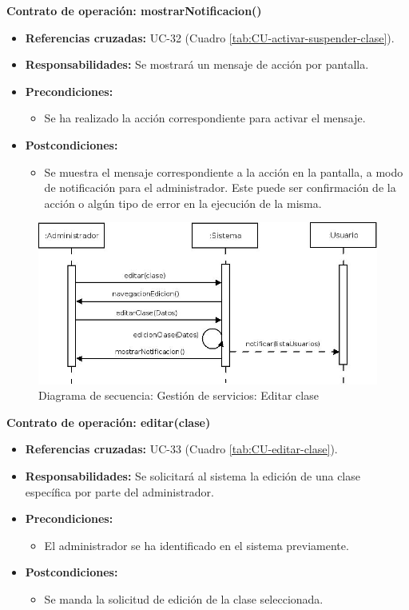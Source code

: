 \textbf{Contrato de operación: mostrarNotificacion()}
\begin{itemize}
\item \textbf{Referencias cruzadas:} UC-32 (Cuadro \ref{tab:CU-activar-suspender-clase}).
\item \textbf{Responsabilidades:} Se mostrará un mensaje de acción por pantalla.
\item \textbf{Precondiciones:} 
 \begin{itemize}
\item Se ha realizado la acción correspondiente para activar el mensaje.
\end {itemize}
\item \textbf{Postcondiciones:} 
 \begin{itemize}
\item Se muestra el mensaje correspondiente a la acción en la pantalla, a modo de notificación para el administrador. Este puede ser confirmación de la acción o algún tipo de error en la ejecución de la misma.
\end {itemize}
\end {itemize}


\vspace{10mm}

\begin{figure}[H]
\centering
  \includegraphics[scale=.50]{img/secuencias/gestion-servicios-editar-clase.jpeg}
  \caption{Diagrama de secuencia: Gestión de servicios: Editar clase}
  \label{fig:secuencia-editar-clase}
\end{figure}

\textbf{Contrato de operación: editar(clase)}
\begin{itemize}
\item \textbf{Referencias cruzadas:} UC-33 (Cuadro \ref{tab:CU-editar-clase}).
\item \textbf{Responsabilidades:} Se solicitará al sistema la edición de una clase específica por parte del administrador.
\item \textbf{Precondiciones:} 
 \begin{itemize}
\item El administrador se ha identificado en el sistema previamente.
\end {itemize}
\item \textbf{Postcondiciones:} 
 \begin{itemize}
\item Se manda la solicitud de edición de la clase seleccionada.
\end {itemize}
\end {itemize}

